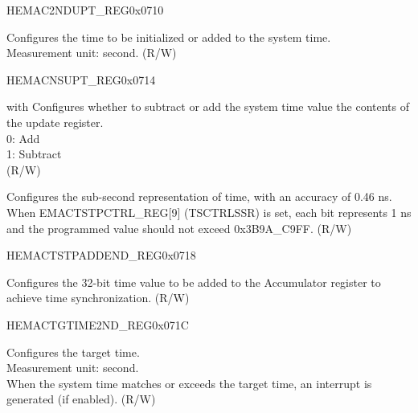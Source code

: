 \begin{register}{H}{EMAC2NDUPT\_REG}{0x0710}\label{regdesc:EMACSECONDSUPDATEREG}
%
\regnewline%
\begin{regdesc}\begin{reglist}
\item [TSSSUPD] Configures the time to be initialized or added to the system time.\\
Measurement unit: second. (R/W)
\end{reglist}\end{regdesc}
\end{register}

\begin{register}{H}{EMACNSUPT\_REG}{0x0714}\label{regdesc:EMACNANOSUPDATEREG}
%
%
\regnewline%
\begin{regdesc}\begin{reglist}
\item [ADDSUB]with  Configures whether to subtract or add the system time value the contents of the update register.\\
0: Add\\
1: Subtract\\ (R/W)
\item [TSSSUPD] Configures the sub-second representation of time, with an accuracy of 0.46 ns.\\
When EMACTSTPCTRL\_REG[9] (TSCTRLSSR) is set, each bit represents 1 ns and the programmed value should not exceed 0x3B9A\_C9FF. (R/W)
\end{reglist}\end{regdesc}
\end{register}

\begin{register}{H}{EMACTSTPADDEND\_REG}{0x0718}\label{regdesc:EMACTIMESTAMPADDENDREG}
%
\regnewline%
\begin{regdesc}\begin{reglist}
\item [TSAR] Configures the 32-bit time value to be added to the Accumulator register to achieve time synchronization. (R/W)
\end{reglist}\end{regdesc}
\end{register}

\begin{register}{H}{EMACTGTIME2ND\_REG}{0x071C}\label{regdesc:EMACTARGETTIMESECONDREG}
%
\regnewline%
\begin{regdesc}\begin{reglist}
\item [TSTR] Configures the target time.\\
Measurement unit: second.\\
When the system time matches or exceeds the target time, an interrupt is generated (if enabled). (R/W)
\end{reglist}\end{regdesc}
\end{register}


